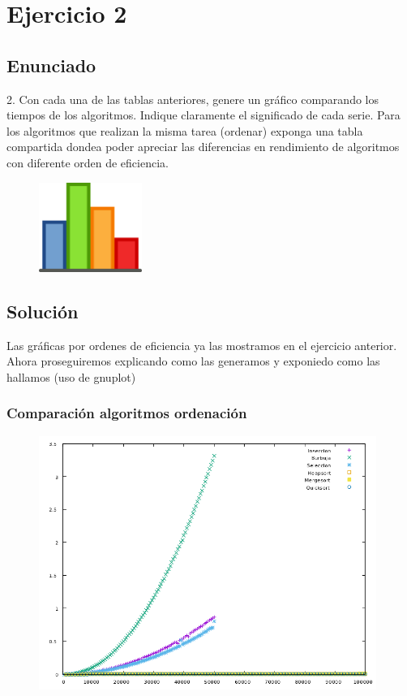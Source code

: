 \documentclass[compress]{beamer}
\begin{document}
\section{Ejercicio 2}
\subsection{Enunciado}

\begin{frame}
	2. Con cada una de las tablas anteriores, genere un gráfico comparando los tiempos  de
los algoritmos. Indique claramente el significado de cada serie. Para los algoritmos que
realizan la misma tarea (ordenar) exponga una tabla compartida dondea poder apreciar las diferencias en rendimiento de algoritmos con diferente orden de
eficiencia.
	\begin{figure}
  \centering
    \includegraphics[width=0.3\textwidth]{graf.png}
  \label{fig:ejemplo}
\end{figure}
\end{frame}
\subsection{Solución}
\begin{frame}
Las gráficas por ordenes de eficiencia ya las mostramos en el ejercicio anterior. Ahora proseguiremos explicando como las generamos y exponiedo como las hallamos (uso de gnuplot)
\end{frame}
\begin{frame}
\frametitle{Comparación algoritmos ordenación}
	\begin{figure}
  \centering
    \includegraphics[width=0.98\textwidth]{Ordenacion.png}
  \label{fig:ejemplo}
\end{figure}
	
\end{frame}
\end{document}
